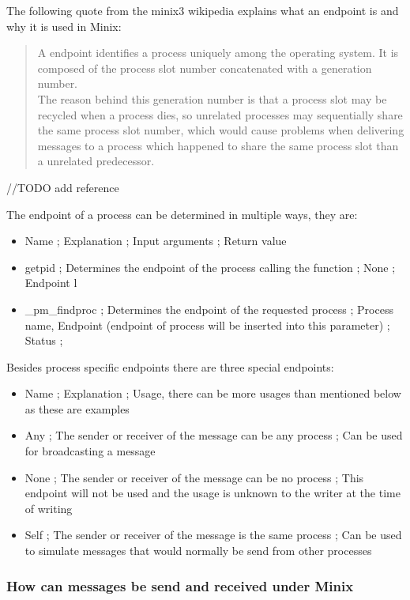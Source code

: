 The following quote from the minix3 wikipedia explains what an endpoint
is and why it is used in Minix:

\begin{quote}
A endpoint identifies a process uniquely among the operating system. It
is composed of the process slot number concatenated with a generation
number.\\
The reason behind this generation number is that a process slot may be
recycled when a process dies, so unrelated processes may sequentially
share the same process slot number, which would cause problems when
delivering messages to a process which happened to share the same
process slot than a unrelated predecessor.
\end{quote}

//TODO add reference

The endpoint of a process can be determined in multiple ways, they are:

\begin{itemize}
\tightlist
\item
  Name ; Explanation ; Input arguments ; Return value
\item
  getpid ; Determines the endpoint of the process calling the function ;
  None ; Endpoint l
\item
  \_pm\_findproc ; Determines the endpoint of the requested process ;
  Process name, Endpoint (endpoint of process will be inserted into this
  parameter) ; Status ;
\end{itemize}

Besides process specific endpoints there are three special endpoints:

\begin{itemize}
\tightlist
\item
  Name ; Explanation ; Usage, there can be more usages than mentioned
  below as these are examples
\item
  Any ; The sender or receiver of the message can be any process ; Can
  be used for broadcasting a message
\item
  None ; The sender or receiver of the message can be no process ; This
  endpoint will not be used and the usage is unknown to the writer at
  the time of writing
\item
  Self ; The sender or receiver of the message is the same process ; Can
  be used to simulate messages that would normally be send from other
  processes
\end{itemize}

\hypertarget{how-can-messages-be-send-and-received-under-minix}{%
\subsubsection{How can messages be send and received under
Minix}\label{how-can-messages-be-send-and-received-under-minix}}

